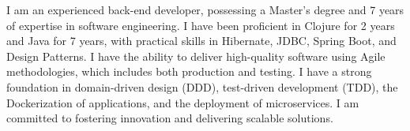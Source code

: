 \vspace*{-15pt}
\begin{referees}
\par{
    I am an experienced back-end developer, possessing a Master's degree and 7 years of expertise in software engineering. I have been proficient in Clojure for 2 years and Java for 7 years, with practical skills in Hibernate, JDBC, Spring Boot, and Design Patterns. I have the ability to deliver high-quality software using Agile methodologies, which includes both production and testing. I have a strong foundation in domain-driven design (DDD), test-driven development (TDD), the Dockerization of applications, and the deployment of microservices. I am committed to fostering innovation and delivering scalable solutions.
}
\end{referees}	
